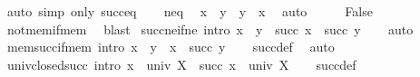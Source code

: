 \begin{isabellebody}
\ {\isacharparenleft}{\kern0pt}auto\ simp\ only{\isacharcolon}{\kern0pt}\ succ{\isacharunderscore}{\kern0pt}eq{\isacharparenright}{\kern0pt}\isanewline
\ \ \isamarkupfalse%
\ neq\ \isamarkupfalse%
\ {\isachardoublequoteopen}x\ {\isasymin}\ y{\isachardoublequoteclose}\ \ {\isachardoublequoteopen}y\ {\isasymin}\ x{\isachardoublequoteclose}\ \isamarkupfalse%
\ auto\isanewline
\ \ \isamarkupfalse%
\ \isamarkupfalse%
\ False\ \isamarkupfalse%
\ not{\isacharunderscore}{\kern0pt}mem{\isacharunderscore}{\kern0pt}if{\isacharunderscore}{\kern0pt}mem\ \isamarkupfalse%
\ blast\isanewline
{}\isamarkupfalse%
%
\endisatagproof
{\isafoldproof}%
%
\isadelimproof
\isanewline
%
\endisadelimproof
\isanewline
{}\isamarkupfalse%
\ succ{\isacharunderscore}{\kern0pt}ne{\isacharunderscore}{\kern0pt}if{\isacharunderscore}{\kern0pt}ne\ {\isacharbrackleft}{\kern0pt}intro{\isacharbang}{\kern0pt}{\isacharbrackright}{\kern0pt}{\isacharcolon}{\kern0pt}\ {\isachardoublequoteopen}x\ {\isasymnoteq}\ y\ {\isasymLongrightarrow}\ succ\ x\ {\isasymnoteq}\ succ\ y{\isachardoublequoteclose}\isanewline
%
\isadelimproof
\ \ %
\endisadelimproof
%
\isatagproof
{}\isamarkupfalse%
\ auto%
\endisatagproof
{\isafoldproof}%
%
\isadelimproof
\isanewline
%
\endisadelimproof
\isanewline
{}\isamarkupfalse%
\ mem{\isacharunderscore}{\kern0pt}succ{\isacharunderscore}{\kern0pt}if{\isacharunderscore}{\kern0pt}mem\ {\isacharbrackleft}{\kern0pt}intro{\isacharbrackright}{\kern0pt}{\isacharcolon}{\kern0pt}\ {\isachardoublequoteopen}x\ {\isasymin}\ y\ {\isasymLongrightarrow}\ x\ {\isasymin}\ succ\ y{\isachardoublequoteclose}\isanewline
%
\isadelimproof
\ \ %
\endisadelimproof
%
\isatagproof
{}\isamarkupfalse%
\ succ{\isacharunderscore}{\kern0pt}def\ \isamarkupfalse%
\ auto%
\endisatagproof
{\isafoldproof}%
%
\isadelimproof
\isanewline
%
\endisadelimproof
\isanewline
{}\isamarkupfalse%
\ univ{\isacharunderscore}{\kern0pt}closed{\isacharunderscore}{\kern0pt}succ\ {\isacharbrackleft}{\kern0pt}intro{\isacharbang}{\kern0pt}{\isacharbrackright}{\kern0pt}{\isacharcolon}{\kern0pt}\ {\isachardoublequoteopen}x\ {\isasymin}\ univ\ X\ {\isasymLongrightarrow}\ succ\ x\ {\isasymin}\ univ\ X{\isachardoublequoteclose}\isanewline
%
\isadelimproof
\ \ %
\endisadelimproof
%
\isatagproof
{}\isamarkupfalse%
\ succ{\isacharunderscore}{\kern0pt}def\ \isamarkupfalse%

\end{isabellebody}
